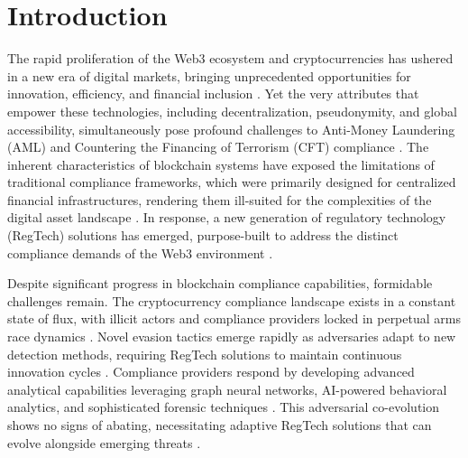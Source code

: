 \documentclass[conference,compsoc]{IEEEtran}
\begin{document}
\IEEEpeerreviewmaketitle


\section{Introduction}

The rapid proliferation of the Web3 ecosystem and cryptocurrencies has ushered in a new era of digital markets, bringing unprecedented opportunities for innovation, efficiency, and financial inclusion \cite{bonneau2015sokresearchperspectives,voshmgir2020tokeneconomyhow,abdelhamid2025reviewblockchaintechnology}. Yet the very attributes that empower these technologies, including decentralization, pseudonymity, and global accessibility, simultaneously pose profound challenges to Anti-Money Laundering (AML) and Countering the Financing of Terrorism (CFT) compliance \cite{force2021updatedguidanceriskbased,financialactiontaskforcefatf2012internationalstandardscombating,huang2020antimoneylaunderingblockchain}. The inherent characteristics of blockchain systems have exposed the limitations of traditional compliance frameworks, which were primarily designed for centralized financial infrastructures, rendering them ill-suited for the complexities of the digital asset landscape \cite{weber2019antimoneylaunderingbitcoin,pocher2023detectinganomalouscryptocurrency,bankforinternationalsettlementsbis2022futuremonetarysystem,aldasoroapproachantimoneylaundering}. In response, a new generation of regulatory technology (RegTech) solutions has emerged, purpose-built to address the distinct compliance demands of the Web3 environment \cite{arner2016fintechregtechreconceptualization,charoenwong2024regtechtechnologydrivencompliance,prosper2025blockchainbasedsolutionsantimoney}.

Despite significant progress in blockchain compliance capabilities, formidable challenges remain. The cryptocurrency compliance landscape exists in a constant state of flux, with illicit actors and compliance providers locked in perpetual arms race dynamics \cite{albrecht2019usecryptocurrenciesmoney,guidara2022cryptocurrencymoneylaundering,prosper2025blockchainbasedsolutionsantimoney}. Novel evasion tactics emerge rapidly as adversaries adapt to new detection methods, requiring RegTech solutions to maintain continuous innovation cycles \cite{unitednationsofficeondrugsandcrimemoneylaunderingcryptocurrencies}. Compliance providers respond by developing advanced analytical capabilities leveraging graph neural networks, AI-powered behavioral analytics, and sophisticated forensic techniques \cite{azad2025machinelearningblockchain,rodriguezvalencia2025systematicreviewartificial,zebari2025comprehensivereviewintegrating}. This adversarial co-evolution shows no signs of abating, necessitating adaptive RegTech solutions that can evolve alongside emerging threats \cite{verma2024impactcryptocurrencymoney,tiwari2025understandingevolvinglandscape}.
\end{document}
